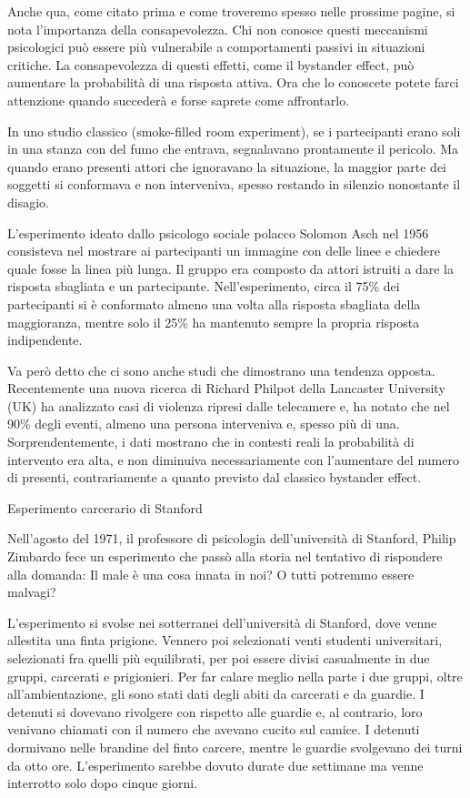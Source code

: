 \documentclass[12pt]{book} %
\begin{document}
Anche qua, come citato prima e come troveremo spesso nelle prossime pagine, si nota l'importanza
della consapevolezza. Chi non conosce questi meccanismi psicologici può essere più vulnerabile a comportamenti passivi in situazioni critiche. La consapevolezza di questi effetti, come il bystander effect, può aumentare la probabilità di una risposta attiva. Ora che lo
conoscete potete farci attenzione quando succederà e forse saprete come affrontarlo. 


\bigskip
\begin{mdframed}[linewidth=1pt]
In uno studio classico (smoke-filled room experiment), se i partecipanti erano soli in una stanza con del fumo che entrava, segnalavano prontamente il pericolo. Ma quando erano presenti attori che ignoravano la situazione, la maggior parte dei soggetti si conformava e non interveniva, spesso restando in silenzio nonostante il disagio.

L'esperimento ideato dallo psicologo sociale polacco Solomon Asch nel 1956 consisteva nel mostrare ai partecipanti un
immagine con delle linee e chiedere quale fosse la linea più lunga. Il gruppo era composto da attori istruiti a dare la
risposta sbagliata e un partecipante. Nell'esperimento, circa il 75\% dei partecipanti si è conformato almeno una volta alla risposta sbagliata della maggioranza, mentre solo il 25\% ha mantenuto sempre la propria risposta indipendente.

Va però detto che ci sono anche studi che dimostrano una tendenza opposta. Recentemente una nuova ricerca di Richard
Philpot della Lancaster University (UK) ha analizzato casi di violenza ripresi dalle telecamere e, ha notato che nel
90\% degli eventi, almeno una persona interveniva e, spesso più di una. Sorprendentemente, i dati mostrano che in contesti reali la probabilità di intervento era alta, e non diminuiva necessariamente con l’aumentare del numero di presenti, contrariamente a quanto previsto dal classico bystander effect.

Esperimento carcerario di Stanford 

Nell'agosto del 1971, il professore di psicologia dell'università di Stanford,
Philip Zimbardo fece un esperimento che passò alla storia nel tentativo di rispondere alla domanda: Il male è una cosa
innata in noi? O tutti potremmo essere malvagi?

L'esperimento si svolse nei sotterranei dell'università di Stanford, dove
venne allestita una finta prigione. Vennero poi selezionati venti studenti universitari, selezionati fra quelli più
equilibrati, per poi essere divisi casualmente in due gruppi, carcerati e prigionieri. Per far calare meglio nella
parte i due gruppi, oltre all'ambientazione, gli sono stati dati degli abiti da carcerati e da
guardie. I detenuti si dovevano rivolgere con rispetto alle guardie e, al contrario, loro venivano chiamati con il numero
che avevano cucito sul camice. I detenuti dormivano nelle brandine del finto carcere, mentre le guardie svolgevano dei
turni da otto ore. L'esperimento sarebbe dovuto durate due settimane ma venne interrotto solo dopo
cinque giorni.


\end{mdframed}
\end{document}
